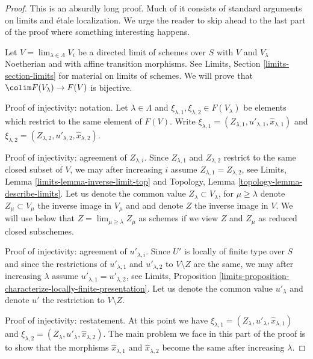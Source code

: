 \begin{proof}
This is an absurdly long proof. Much of it consists of standard
arguments on limits and \'etale localization. We urge the reader to skip ahead
to the last part of the proof where something interesting happens.

\medskip\noindent
Let $V = \lim_{\lambda \in \Lambda} V_i$ be a directed limit of schemes
over $S$ with $V$ and $V_\lambda$ Noetherian and with affine transition
morphisms. See Limits, Section \ref{limits-section-limits} for material on
limits of schemes. We will prove that $\colim F(V_\lambda) \to F(V)$
is bijective.

\medskip\noindent
Proof of injectivity: notation.
Let $\lambda \in \Lambda$ and
$\xi_{\lambda, 1}, \xi_{\lambda, 2} \in F(V_\lambda)$ 
be elements which restrict to the same element of $F(V)$.
Write $\xi_{\lambda, 1} = (Z_{\lambda, 1}, u'_{\lambda, 1},
\hat x_{\lambda, 1})$ and
$\xi_{\lambda, 2} = (Z_{\lambda, 2}, u'_{\lambda, 2}, \hat x_{\lambda, 2})$.

\medskip\noindent
Proof of injectivity: agreement of $Z_{\lambda, i}$.
Since $Z_{\lambda, 1}$ and $Z_{\lambda, 2}$ restrict to the same closed
subset of $V$, we may after increasing $i$ assume
$Z_{\lambda, 1} = Z_{\lambda, 2}$, see
Limits, Lemma \ref{limits-lemma-inverse-limit-top} and
Topology, Lemma \ref{topology-lemma-describe-limits}.
Let us denote the common value $Z_\lambda \subset V_\lambda$, for
$\mu \geq \lambda$
denote $Z_\mu \subset V_\mu$ the inverse image in $V_\mu$ and
and denote $Z$ the inverse image in $V$. We will use below that
$Z = \lim_{\mu \geq \lambda} Z_\mu$ as schemes if we view $Z$
and $Z_\mu$ as reduced closed subschemes.

\medskip\noindent
Proof of injectivity: agreement of $u'_{\lambda, i}$.
Since $U'$ is locally of finite type over $S$ and since
the restrictions of $u'_{\lambda, 1}$ and $u'_{\lambda, 2}$
to $V \setminus Z$ are the same, we may after increasing $\lambda$ assume
$u'_{\lambda, 1} = u'_{\lambda, 2}$, see Limits, Proposition
\ref{limits-proposition-characterize-locally-finite-presentation}.
Let us denote the common value $u'_\lambda$ and denote
$u'$ the restriction to $V \setminus Z$.

\medskip\noindent
Proof of injectivity: restatement.
At this point we have
$\xi_{\lambda, 1} = (Z_\lambda, u'_\lambda, \hat x_{\lambda, 1})$ and
$\xi_{\lambda, 2} = (Z_\lambda, u'_\lambda, \hat x_{\lambda, 2})$.
The main problem we face in this part of the proof
is to show that the morphisms
$\hat x_{\lambda, 1}$ and $\hat x_{\lambda, 2}$ become the same after
increasing $\lambda$.


\end{proof}
